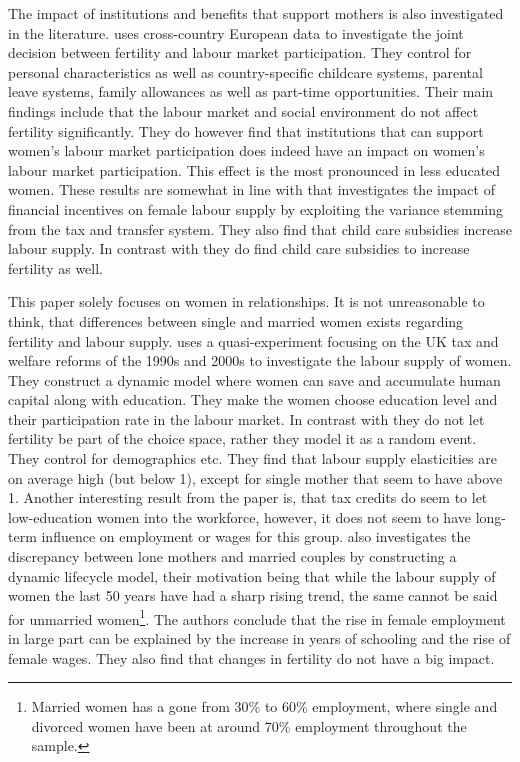 The impact of institutions and benefits that support mothers is also investigated in the literature. \textcite{del_boca_motherhood_2009}  uses cross-country European data to investigate the joint decision between fertility and labour market participation. They control for personal characteristics as well as country-specific childcare systems, parental leave systems, family allowances as well as part-time opportunities. Their main findings include that the labour market and social environment do not affect fertility significantly. They do however find that institutions that can support women's labour market participation does indeed have an impact on women's labour market participation. This effect is the most pronounced in less educated women. These results are somewhat in line with \textcite{haan_can_2009} that investigates the impact of financial incentives on female labour supply by exploiting the variance stemming from the tax and transfer system. They also find that child care subsidies increase labour supply. In contrast with \textcite{del_boca_motherhood_2009} they do find child care subsidies to increase fertility as well.

This paper solely focuses on women in relationships. It is not unreasonable to think, that differences between single and married women exists regarding fertility and labour supply. \textcite{blundell_female_2016} uses a quasi-experiment focusing on the UK tax and welfare reforms of the 1990s and 2000s to investigate the labour supply of women. They construct a dynamic model where women can save and accumulate human capital along with education. They make the women choose education level and their participation rate in the labour market. In contrast with \textcite{francesconi_joint_2002} they do not let fertility be part of the choice space, rather they model it as a random event. They control for demographics etc. They find that labour supply elasticities are on average high (but below 1), except for single mother that seem to have above 1. Another interesting result from the paper is, that tax credits do seem to let low-education women into the workforce, however, it does not seem to have long-term influence on employment or wages for this group. \textcite{eckstein_dynamic_2011} also investigates the discrepancy between lone mothers and married couples by constructing a dynamic lifecycle model, their motivation being that while the labour supply of women the last 50 years have had a sharp rising trend, the same cannot be said for unmarried women\footnote{Married women has a gone from 30\% to 60\% employment, where single and divorced women have been at around 70\% employment throughout the sample.}. The authors conclude that the rise in female employment in large part can be explained by the increase in years of schooling and the rise of female wages. They also find that changes in fertility do not have a big impact. 

